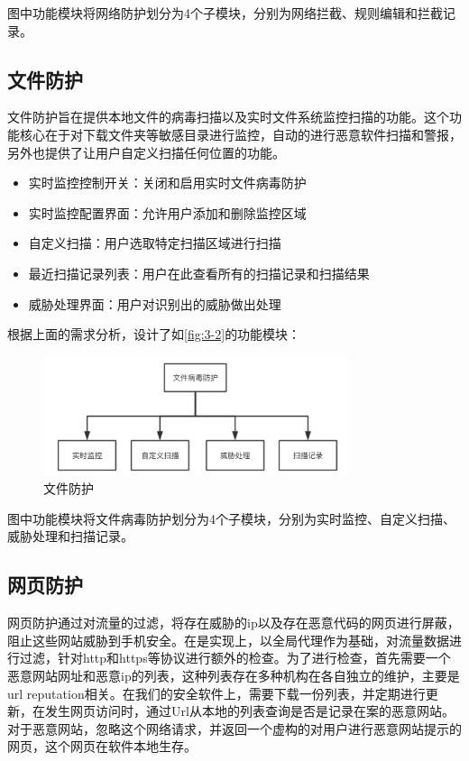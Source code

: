 \documentclass[format=final, language=chinese, degree=fyp]{hustthesis}
\begin{document}
图中功能模块将网络防护划分为4个子模块，分别为网络拦截、规则编辑和拦截记录。

\subsection{文件防护}

文件防护旨在提供本地文件的病毒扫描以及实时文件系统监控扫描的功能。这个功能核心在于对下载文件夹等敏感目录进行监控，自动的进行恶意软件扫描和警报，另外也提供了让用户自定义扫描任何位置的功能。

\begin{itemize}
    \item 实时监控控制开关：关闭和启用实时文件病毒防护
    \item 实时监控配置界面：允许用户添加和删除监控区域
    \item 自定义扫描：用户选取特定扫描区域进行扫描
    \item 最近扫描记录列表：用户在此查看所有的扫描记录和扫描结果
    \item 威胁处理界面：用户对识别出的威胁做出处理
\end{itemize}

根据上面的需求分析，设计了如\autoref{fig:3-2}的功能模块：
\begin{figure}[!h]
	\centering
	\includegraphics[width=0.8\textwidth]{function_2.png}
	\caption{文件防护}\label{fig:3-2}
\end{figure}

图中功能模块将文件病毒防护划分为4个子模块，分别为实时监控、自定义扫描、威胁处理和扫描记录。


\FloatBarrier
\subsection{网页防护}

网页防护通过对流量的过滤，将存在威胁的ip以及存在恶意代码的网页进行屏蔽，阻止这些网站威胁到手机安全。在是实现上，以全局代理作为基础，对流量数据进行过滤，针对http和https等协议进行额外的检查。为了进行检查，首先需要一个恶意网站网址和恶意ip的列表，这种列表存在多种机构在各自独立的维护，主要是url reputation相关。在我们的安全软件上，需要下载一份列表，并定期进行更新，在发生网页访问时，通过Url从本地的列表查询是否是记录在案的恶意网站。对于恶意网站，忽略这个网络请求，并返回一个虚构的对用户进行恶意网站提示的网页，这个网页在软件本地生存。
\end{document}
